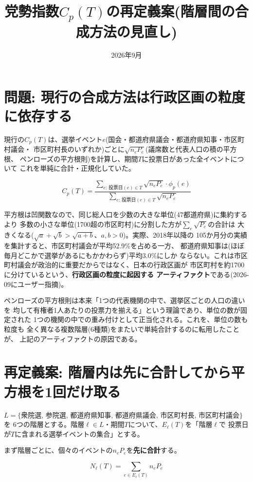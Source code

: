 \documentclass[a4paper,11pt]{ltjsarticle}
\title{党勢指数$C_p(T)$の再定義案(階層間の合成方法の見直し)}
\author{}
\date{2026年9月}
\begin{document}
\maketitle

\section{問題: 現行の合成方法は行政区画の粒度に依存する}

現行の$C_p(T)$は、選挙イベント$e$(国会・都道府県議会・都道府県知事・市区町村議会・
市区町村長のいずれか)ごとに$\sqrt{n_eP_e}$(議席数と代表人口の積の平方根、
ペンローズの平方根則)を計算し、期間$T$に投票日があった全イベントについて
これを単純に合計・正規化していた。

$$C_p(T) = \frac{\displaystyle\sum_{e:\,投票日(e)\in T} \sqrt{n_eP_{e}}\cdot\phi_p(e)}
                  {\displaystyle\sum_{e:\,投票日(e)\in T} \sqrt{n_eP_{e}}}$$

平方根は凹関数なので、同じ総人口を少数の大きな単位(47都道府県)に集約するより
多数の小さな単位(1700超の市区町村)に分割した方が$\sum_e\sqrt{P_e}$の合計は
大きくなる($\sqrt{a}+\sqrt{b} > \sqrt{a+b}$、$a,b>0$)。実際、2018年以降の
105か月分の実績を集計すると、市区町村議会が平均52.9\%を占める一方、
都道府県知事は(ほぼ毎月どこかで選挙があるにもかかわらず)平均3.0\%にしか
ならない。これは市区町村議会が政治的に重要だからではなく、日本の行政区画が
市区町村を約1700に分けているという、\textbf{行政区画の粒度に起因する
アーティファクト}である(2026-09にユーザー指摘)。

ペンローズの平方根則は本来「1つの代表機関の中で、選挙区ごとの人口の違いを
均して有権者1人あたりの投票力を揃える」という理論であり、単位の数が固定された
1つの機関の中での重み付けとして正当化される。これを、単位の数も粒度も
全く異なる複数階層(6種類)をまたいで単純合計するのに転用したことが、
上記のアーティファクトの原因である。

\section{再定義案: 階層内は先に合計してから平方根を1回だけ取る}

$L=\{$衆院選, 参院選, 都道府県知事, 都道府県議会, 市区町村長, 市区町村議会$\}$を
6つの階層とする。階層$\ell\in L$・期間$T$について、$E_\ell(T)$を「階層$\ell$で
投票日が$T$に含まれる選挙イベントの集合」とする。

まず階層ごとに、個々のイベントの$n_eP_e$を\textbf{先に合計}する。

$$N_\ell(T) = \sum_{e\in E_\ell(T)} n_eP_e$$
\end{document}
